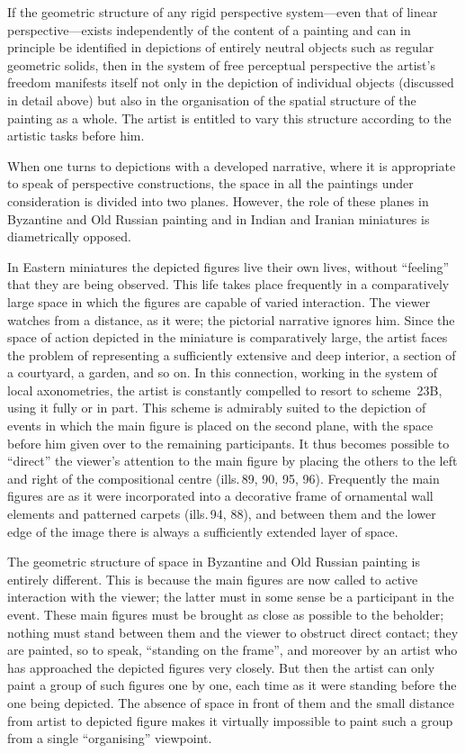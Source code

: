 If the geometric structure of any rigid perspective system---even that of linear
perspective---exists independently of the content of a painting and can in principle
be identified in depictions of entirely neutral objects such as regular geometric
solids, then in the system of free perceptual perspective the artist's freedom
manifests itself not only in the depiction of individual objects (discussed in
detail above) but also in the organisation of the spatial structure of the painting
as a whole. The artist is entitled to vary this structure according to the artistic
tasks before him.

When one turns to depictions with a developed narrative, where it is appropriate to
speak of perspective constructions, the space in all the paintings under
consideration is divided into two planes. However, the role of these planes in
Byzantine and Old Russian painting and in Indian and Iranian miniatures is
diametrically opposed.

In Eastern miniatures the depicted figures live their own lives, without ``feeling''
that they are being observed. This life takes place frequently in a comparatively
large space in which the figures are capable of varied interaction. The viewer
watches from a distance, as it were; the pictorial narrative ignores him. Since the
space of action depicted in the miniature is comparatively large, the artist faces
the problem of representing a sufficiently extensive and deep interior, a section of
a courtyard, a garden, and so on. In this connection, working in the system of local
axonometries, the artist is constantly compelled to resort to scheme~23B, using it
fully or in part. This scheme is admirably suited to the depiction of events in
which the main figure is placed on the second plane, with the space before him given
over to the remaining participants. It thus becomes possible to ``direct'' the
viewer's attention to the main figure by placing the others to the left and right of
the compositional centre (ills.\,89, 90, 95, 96). Frequently the main figures are
as it were incorporated into a decorative frame of ornamental wall elements and
patterned carpets (ills.\,94, 88), and between them and the lower edge of the image
there is always a sufficiently extended layer of space.


The geometric structure of space in Byzantine and Old Russian painting is entirely
different. This is because the main figures are now called to active interaction
with the viewer; the latter must in some sense be a participant in the event. These
main figures must be brought as close as possible to the beholder; nothing must
stand between them and the viewer to obstruct direct contact; they are painted,
so to speak, ``standing on the frame'', and moreover by an artist who has approached
the depicted figures very closely. But then the artist can only paint a group of
such figures one by one, each time as it were standing before the one being depicted.
The absence of space in front of them and the small distance from artist to depicted
figure makes it virtually impossible to paint such a group from a single
``organising'' viewpoint.

